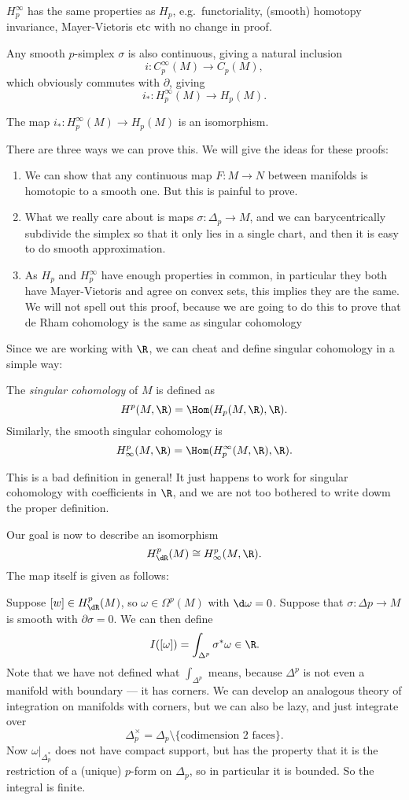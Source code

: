 \documentclass[a4paper]{article}
\begin{document}
$H_p^\infty$ has the same properties as $H_p$, e.g.\ functoriality, (smooth) homotopy invariance, Mayer-Vietoris etc with no change in proof.

Any smooth $p$-simplex $\sigma$ is also continuous, giving a natural inclusion
\[
  i: C_p^\infty(M) \to C_p(M),
\]
which obviously commutes with $\partial$, giving
\[
  i_*: H_p^\infty(M) \to H_p(M).
\]
\begin{thm}
  The map $i_*: H_p^\infty(M) \to H_p(M)$ is an isomorphism.
\end{thm}

There are three ways we can prove this. We will give the ideas for these proofs:
\begin{enumerate}
  \item We can show that any continuous map $F: M \to N$ between manifolds is homotopic to a smooth one. But this is painful to prove.
  \item What we really care about is maps $\sigma: \Delta_p \to M$, and we can barycentrically subdivide the simplex so that it only lies in a single chart, and then it is easy to do smooth approximation.
  \item As $H_p$ and $H_p^\infty$ have enough properties in common, in particular they both have Mayer-Vietoris and agree on convex sets, this implies they are the same. We will not spell out this proof, because we are going to do this to prove that de Rham cohomology is the same as singular cohomology
\end{enumerate}

Since we are working with $\R$, we can cheat and define singular cohomology in a simple way:
\begin{defi}
  The \emph{singular cohomology} of $M$ is defined as
  \[
    H^p(M, \R) = \Hom(H_p(M, \R), \R).
  \]
  Similarly, the smooth singular cohomology is
  \[
    H^p_\infty(M, \R) = \Hom(H_p^\infty(M, \R), \R).
  \]
\end{defi}
This is a bad definition in general! It just happens to work for singular cohomology with coefficients in $\R$, and we are not too bothered to write dowm the proper definition.

Our goal is now to describe an isomorphism
\[
  H^p_{\dR}(M) \cong H^p_\infty(M, \R).
\]
The map itself is given as follows:

Suppose $[w] \in H^p_{\dR}(M)$, so $\omega \in \Omega^p(M)$ with $\d \omega = 0$. Suppose that $\sigma: \Delta p \to M$ is smooth with $\partial \sigma = 0$. We can then define
\[
  I([\omega]) = \int_{\Delta^p} \sigma^* \omega \in \R.
\]
Note that we have not defined what $\int_{\Delta^p}$ means, because $\Delta^p$ is not even a manifold with boundary --- it has corners. We can develop an analogous theory of integration on manifolds with corners, but we can also be lazy, and just integrate over
\[
  \Delta_p^\times = \Delta_p \setminus \{\text{codimension 2 faces}\}.
\]
Now $\omega|_{\Delta_p^*}$ does not have compact support, but has the property that it is the restriction of a (unique) $p$-form on $\Delta_p$, so in particular it is bounded. So the integral is finite.
\end{document}

